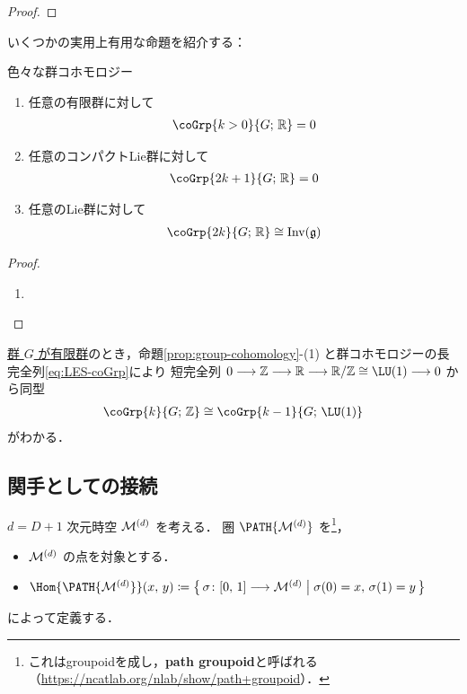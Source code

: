\documentclass[TQFT_main]{subfiles}
\begin{document}
\begin{proof}
    
\end{proof}

いくつかの実用上有用な命題を紹介する：
\begin{myprop}[label=prop:group-cohomology]{色々な群コホモロジー}
    \begin{enumerate}
        \item 任意の有限群に対して
        \begin{align}
            \coGrp{k > 0}{G;\, \mathbb{R}} = 0
        \end{align}
        \item 任意のコンパクトLie群に対して
        \begin{align}
            \coGrp{2k+1}{G;\, \mathbb{R}} = 0
        \end{align}
        \item 任意のLie群に対して
        \begin{align}
            \coGrp{2k}{G;\, \mathbb{R}} \cong \mathrm{Inv}(\mathfrak{g})
        \end{align}
    \end{enumerate}
\end{myprop}

\begin{proof}
    \begin{enumerate}
        \item 
    \end{enumerate}
\end{proof}

\underline{群 $G$ が有限群}のとき，命題\ref{prop:group-cohomology}-(1) と群コホモロジーの長完全列\eqref{eq:LES-coGrp}により
短完全列 $0 \lto \mathbb{Z} \lto \mathbb{R} \lto \mathbb{R}/\mathbb{Z} \cong \LU (1) \lto 0$ から同型
\begin{align}
    \label{eq:finiteG-groupcohomology}
    \coGrp{k}{G;\, \mathbb{Z}} \cong \coGrp{k-1}{G;\, \LU(1)}
\end{align}
がわかる．

\subsection{関手としての接続}

$d=D+1$ 次元時空 $\mathcal{M}^{(d)}$ を考える．
圏 $\PATH{\mfdcal{M}{d}}$ を\footnote{これはgroupoidを成し，\textbf{path groupoid}と呼ばれる（\url{https://ncatlab.org/nlab/show/path+groupoid}）．}，
\begin{itemize}
    \item $\mathcal{M}^{(d)}$ の点を対象とする．
    \item $\Hom{\PATH{\mfdcal{M}{d}}}(x,\, y) \coloneqq \bigl\{\, \sigma \colon [0,\, 1] \lto \mfdcal{M}{d} \bigm| \sigma(0) = x,\, \sigma(1) = y \,\bigr\}$ 
\end{itemize}
によって定義する．
\end{document}
